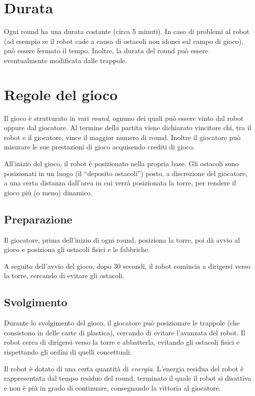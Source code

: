 \section{Durata} 
Ogni round ha una durata costante (circa 5 minuti). In caso di problemi al robot (ad esempio se il robot cade a causa di ostacoli non idonei sul campo di gioco), può essere fermato il tempo. Inoltre, la durata del round può essere eventualmente modificata dalle trappole.

\section{Regole del gioco} 
Il gioco è strutturato in vari \emph{round}, ognuno dei quali può essere vinto dal robot oppure dal giocatore. Al termine della partita viene dichiarato vincitore chi, tra il robot e il giocatore, vince il maggior numero di round. Inoltre il giocatore può misurare le sue prestazioni di gioco acquisendo crediti di gioco.

All'inizio del gioco, il robot è posizionato nella propria base. Gli ostacoli sono posizionati in un luogo (il ``deposito ostacoli'') posto, a discrezione del giocatore, a una certa distanza dall'area in cui verrà posizionata la torre, per rendere il gioco più (o meno) dinamico.


	\subsection*{Preparazione}
Il giocatore, prima dell'inizio di ogni round, posiziona la torre, poi dà avvio al gioco e posiziona gli ostacoli fisici e le fabbriche.

A seguito dell'avvio del gioco, dopo 30 secondi, il robot comincia a dirigersi verso la torre, cercando di evitare gli ostacoli.
	
	\subsection*{Svolgimento}
	Durante lo svolgimento del gioco, il giocatore può posizionare le trappole (che consistono in delle carte di plastica), cercando di evitare l'avanzata del robot. Il robot cerca di dirigersi verso la torre e abbatterla, evitando gli ostacoli fisici e rispettando gli ordini di quelli concettuali.

Il robot è dotato di una certa quantità di \emph{energia}. L'energia residua del robot è rappresentata dal tempo residuo del round, terminato il quale il robot si disattiva e non è più in grado di continuare, consegnando la vittoria al giocatore.

